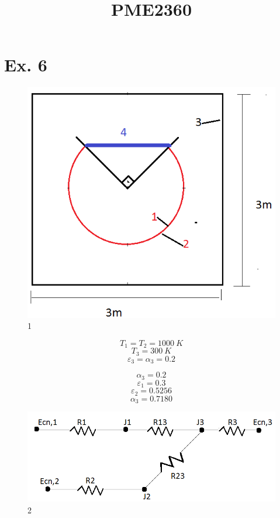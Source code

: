 \documentclass[a4paper, 12pt]{article}
\title{PME2360}
\begin{document}
\maketitle

\section{Ex. 6}

\begin{figure}[h]
\begin{center}
\includegraphics[scale=0.48]{./fig/1.png}
\caption{\label{fig:1}1} 
\end{center}
\end{figure}

\[T_{1} = T_{2} = 1000 \ K\]
\[T_{3} = 300 \ K\]
\[\varepsilon _{3} = \alpha _{3} = 0.2\]

\[\alpha _{3} = 0.2\]
\[\varepsilon _{1} = 0.3\]
\[\varepsilon _{2} = 0.5256\]
\[\alpha _{3} = 0.7180\]

\begin{figure}[h]
\begin{center}
\includegraphics[scale=0.6]{./fig/2.png}
\caption{\label{fig:2}2} 
\end{center}
\end{figure}
\end{document}
